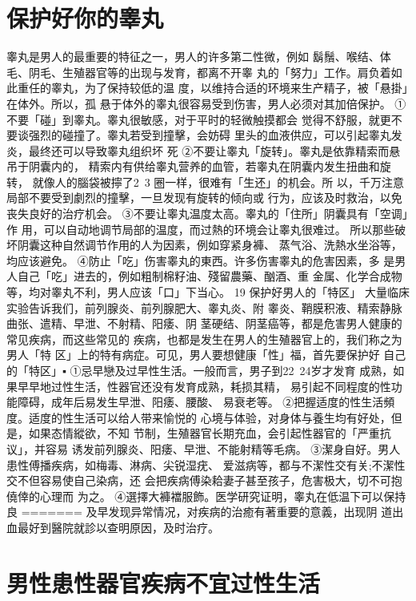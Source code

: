 \documentclass[12pt,UTF8]{ctexbook}
\begin{document}
\section{保护好你的睾丸}
睾丸是男人的最重要的特征之一，男人的许多第二性微，例如
鬍鬚、喉结、体毛、阴毛、生殖器官等的出现与发育，都离不开睾
丸的「努力」工作。肩负着如此重任的睾丸，为了保持较低的温
度，以维持合适的环境来生产精子，被「悬掛」在体外。所以，孤
悬于体外的睾丸很容易受到伤害，男人必须对其加倍保护。
①不要「碰」到睾丸。睾丸很敏感，对于平时的轻微触摸都会
觉得不舒服，就更不要谈强烈的碰撞了。睾丸若受到撞擊，会妨碍
里头的血液供应，可以引起睾丸发炎，最终还可以导致睾丸组织坏
死
②不要让睾丸「旋转」。睾丸是依靠精索而悬吊于阴囊内的，
精索内有供给睾丸营养的血管，若睾丸在阴囊内发生扭曲和旋转，
就像人的腦袋被擰了2~3 圈一样，很难有「生还」的机会。所
以，千万注意局部不要受到劇烈的撞擊，一旦发现有旋转的倾向或
行为，应该及时救治，以免丧失良好的治疗机会。
③不要让睾丸温度太高。睾丸的「住所」阴囊具有「空调」作
用，可以自动地调节局部的温度，而过熱的环境会让睾丸很难过。
所以那些破坏阴囊这种自然调节作用的人为因素，例如穿紧身褲、
蒸气浴、洗熱水坐浴等，均应该避免。
④防止「吃」伤害睾丸的東西。许多伤害睾丸的危害因素，多
是男人自己「吃」进去的，例如粗制棉籽油、殘留農藥、酗酒、重
金属、化学合成物等，均对睾丸不利，男人应该「口」下当心。
19 保护好男人的「特区」
大量临床实验告诉我们，前列腺炎、前列腺肥大、睾丸炎、附
睾炎、鞘膜积液、精索静脉曲张、遣精、早泄、不射精、阳痿、阴
茎硬结、阴茎癌等，都是危害男人健康的常见疾病，而这些常见的
疾病，也都是发生在男人的生殖器官上的，我们称之为男人「特
区」上的特有病症。可见，男人要想健康「性」福，首先要保护好
自己的「特区」▪
①忌早戀及过早性生活。一般而言，男子到22~24岁才发育
成熟，如果早早地过性生活，性器官还没有发育成熟，耗损其精，
易引起不同程度的性功能障碍，成年后易发生早泄、阳痿、腰酸、
易衰老等。
②把握适度的性生活頻度。适度的性生活可以给人带来愉悦的
心境与体验，对身体与養生均有好处，但是，如果态情縱欲，不知
节制，生殖器官长期充血，会引起性器官的「严重抗议」，并容易
诱发前列腺炎、阳痿、早泄、不能射精等毛病。
③潔身自好。男人患性傅播疾病，如梅毒、淋病、尖锐湿疣、
爱滋病等，都与不潔性交有关;不潔性交不但容易使自己染病，还
会把疾病傅染耠妻子甚至孩子，危害极大，切不可抱僥倖的心理而
为之。
④選擇大褲襠服飾。医学研究证明，睾丸在低温下可以保持良
=======
及早发现异常情况，对疾病的治癒有著重要的意義，出现阴
道出血最好到醫院就診以查明原因，及时治疗。

\section{男性患性器官疾病不宜过性生活}
\end{document}
